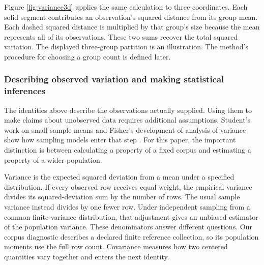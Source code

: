 \documentclass[10pt,letterpaper]{article}
\begin{document}
\FloatBarrier
Figure \ref{fig:variance3d} applies the same calculation to three coordinates. Each solid segment contributes an observation's squared distance from its group mean. Each dashed squared distance is multiplied by that group's size because the mean represents all of its observations. These two sums recover the total squared variation. The displayed three-group partition is an illustration. The method's procedure for choosing a group count is defined later.\par

\subsubsection{Describing observed variation and making statistical inferences}
The identities above describe the observations actually supplied. Using them to make claims about unobserved data requires additional assumptions. Student's work on small-sample means and Fisher's development of analysis of variance show how sampling models enter that step \cite{student,fisher1918,fisher1921,fisher1923,fisher1925}. For this paper, the important distinction is between calculating a property of a fixed corpus and estimating a property of a wider population.\par

Variance is the expected squared deviation from a mean under a specified distribution. If every observed row receives equal weight, the empirical variance divides its squared-deviation sum by the number of rows. The usual sample variance instead divides by one fewer row. Under independent sampling from a common finite-variance distribution, that adjustment gives an unbiased estimator of the population variance. These denominators answer different questions. Our corpus diagnostic describes a declared finite reference collection, so its population moments use the full row count. Covariance measures how two centered quantities vary together and enters the next identity.\par
\end{document}
